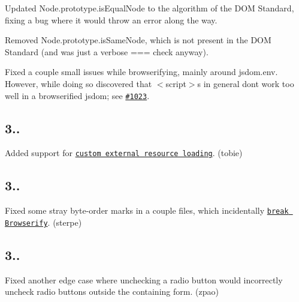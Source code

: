 \begin{DoxyItemize}
\item Updated {\ttfamily Node.\+prototype.\+is\+Equal\+Node} to the algorithm of the D\+OM Standard, fixing a bug where it would throw an error along the way.
\item Removed {\ttfamily Node.\+prototype.\+is\+Same\+Node}, which is not present in the D\+OM Standard (and was just a verbose {\ttfamily ===} check anyway).
\item Fixed a couple small issues while browserifying, mainly around {\ttfamily jsdom.\+env}. However, while doing so discovered that {\ttfamily $<$script$>$}s in general don\textquotesingle{}t work too well in a browserified jsdom; see \href{https://github.com/tmpvar/jsdom/issues/1023}{\tt \#1023}.
\end{DoxyItemize}

\subsection*{3..}


\begin{DoxyItemize}
\item Added support for \href{https://github.com/tmpvar/jsdom#custom-external-resource-loader}{\tt custom external resource loading}. (tobie)
\end{DoxyItemize}

\subsection*{3..}


\begin{DoxyItemize}
\item Fixed some stray byte-\/order marks in a couple files, which incidentally \href{https://github.com/substack/node-browserify/issues/1095}{\tt break Browserify}. (sterpe)
\end{DoxyItemize}

\subsection*{3..}


\begin{DoxyItemize}
\item Fixed another edge case where unchecking a radio button would incorrectly uncheck radio buttons outside the containing form. (zpao)
\end{DoxyItemize}


